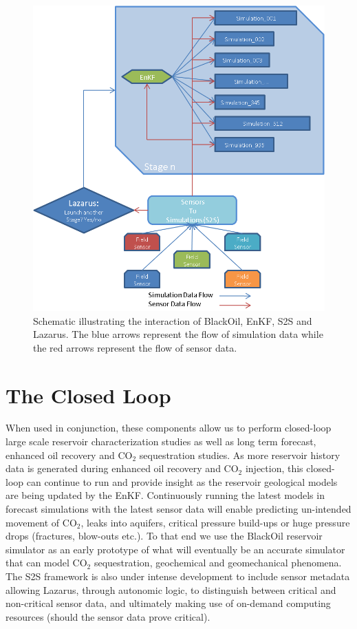 \documentclass[10pt,conference,final]{IEEEtran}
\begin{document}
\begin{figure}
\begin{center}
\includegraphics*[scale=0.65,angle=0]{figures/Picture2.png}
\end{center}
\caption{Schematic illustrating the interaction of BlackOil, EnKF, S2S and Lazarus. The 
blue arrows represent the flow of 
simulation data while the red arrows represent the flow of sensor data.}
\label{fig:Data Flow}
\end{figure}

\section*{The Closed Loop}

When used in conjunction, these components allow us to perform closed-loop large scale reservoir characterization studies as well as long term forecast, enhanced oil recovery and CO$_2$ sequestration studies. As more reservoir history data is generated during enhanced oil recovery and CO$_2$ injection, this closed-loop can continue to run and provide insight as the reservoir geological models are being updated by the EnKF.  Continuously running the latest models in forecast simulations with the latest sensor data will enable predicting un-intended movement of CO$_2$, leaks into aquifers, critical pressure build-ups or huge pressure drops (fractures, blow-outs etc.). To that end we use the BlackOil reservoir simulator as an early prototype of what will eventually be an accurate simulator that can model CO$_2$ sequestration, geochemical and geomechanical phenomena. The S2S framework is also under intense development to include sensor metadata allowing Lazarus, through autonomic logic, to distinguish between critical and non-critical sensor data, and ultimately making use of on-demand computing resources (should the sensor data prove critical).
\end{document}
